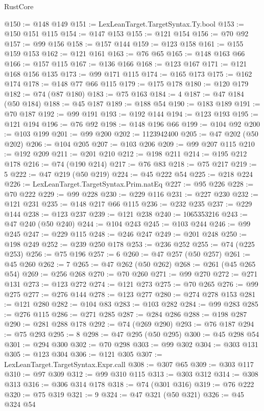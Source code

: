 \begin{lexlean}{RustCore}
\begin{coremodule}
@150 := @148 @149
@151 := LexLeanTarget.TargetSyntax.Ty.bool
@153 := @150 @151 @115
@154 := @147 @153
@155 := @121 @154
@156 := @70 @92
@157 := @99 @156
@158 := @157 @144
@159 := @123 @158
@161 := @155 @159 @153
@162 := @121 @161
@163 := @76 @65
@165 := @148 @163 @66
@166 := @157 @115
@167 := @136 @166
@168 := @123 @167
@171 := @121 @168 @156 @135
@173 := @99 @171 @115
@174 := @165 @173
@175 := @162 @174
@178 := @148 @77 @66 @115
@179 := @175 @178
@180 := @120 @179
@182 := @74 (@87 @180)
@183 := @75 @163
@184 := 4
@187 := @47 @184 (@50 @184)
@188 := @45 @187
@189 := @188 @54
@190 := @183 @189
@191 := @70 @187
@192 := @99 @191
@193 := @192 @144
@194 := @123 @193
@195 := @121 @194
@196 := @76 @92
@198 := @148 @196 @66
@199 := @104 @92
@200 := @103 @199
@201 := @99 @200
@202 := 1123942400
@205 := @47 @202 (@50 @202)
@206 := @104 @205
@207 := @103 @206
@209 := @99 @207 @115
@210 := @192 @209
@211 := @201 @210
@212 := @198 @211
@214 := @195 @212 @178
@216 := @74 (@190 @214)
@217 := @76 @83
@218 := @75 @217
@219 := 5
@222 := @47 @219 (@50 @219)
@224 := @45 @222 @54
@225 := @218 @224
@226 := LexLeanTarget.TargetSyntax.Prim.natEq
@227 := @95 @226
@228 := @70 @222
@229 := @99 @228
@230 := @229 @116
@231 := @227 @230
@232 := @121 @231
@235 := @148 @217 @66 @115
@236 := @232 @235
@237 := @229 @144
@238 := @123 @237
@239 := @121 @238
@240 := 1065353216
@243 := @47 @240 (@50 @240)
@244 := @104 @243
@245 := @103 @244
@246 := @99 @245
@247 := @229 @115
@248 := @246 @247
@249 := @201 @248
@250 := @198 @249
@252 := @239 @250 @178
@253 := @236 @252
@255 := @74 (@225 @253)
@256 := @75 @196
@257 := 6
@260 := @47 @257 (@50 @257)
@261 := @45 @260
@262 := 7
@265 := @47 @262 (@50 @262)
@268 := @261 (@45 @265 @54)
@269 := @256 @268
@270 := @70 @260
@271 := @99 @270
@272 := @271 @131
@273 := @123 @272
@274 := @121 @273
@275 := @70 @265
@276 := @99 @275
@277 := @276 @144
@278 := @123 @277
@280 := @274 @278 @153
@281 := @121 @280
@282 := @104 @83
@283 := @103 @282
@284 := @99 @283
@285 := @276 @115
@286 := @271 @285
@287 := @284 @286
@288 := @198 @287
@290 := @281 @288 @178
@292 := @74 (@269 @290)
@293 := @76 @187
@294 := @75 @293
@295 := 8
@298 := @47 @295 (@50 @295)
@300 := @45 @298 @54
@301 := @294 @300
@302 := @70 @298
@303 := @99 @302
@304 := @303 @131
@305 := @123 @304
@306 := @121 @305
@307 := LexLeanTarget.TargetSyntax.Expr.call
@308 := @307 @65
@309 := @303 @117
@310 := @97 @309
@312 := @99 @310 @115
@313 := @303 @312
@314 := @308 @313
@316 := @306 @314 @178
@318 := @74 (@301 @316)
@319 := @76 @222
@320 := @75 @319
@321 := 9
@324 := @47 @321 (@50 @321)
@326 := @45 @324 @54

\end{coremodule}
\end{lexlean}
